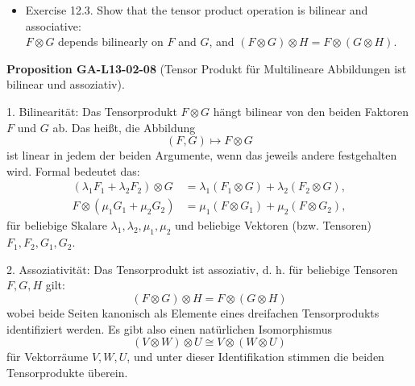 \documentclass[10pt, letterpaper]{article}
\newcommand{\CustomHeading}[3]{%
  \par\medskip\noindent%
  \textbf{#1 #2} \textnormal{(#3)}.\enskip%
}
\newenvironment{PROP}[2]{\begin{unitbox}\CustomHeading{Proposition}{#1}{#2}}{\end{unitbox}}
\begin{document}
\begin{itemize}
  \item Exercise 12.3. Show that the tensor product operation is bilinear and associative:\\
  $F \otimes G$ depends bilinearly on $F$ and $G$, and $(F \otimes G) \otimes H=F \otimes(G \otimes H)$.\\
\end{itemize}


\begin{PROP}{GA-L13-02-08}{Tensor Produkt für Multilineare Abbildungen ist bilinear und assoziativ}
1. Bilinearität: Das Tensorprodukt $F \otimes G$ hängt bilinear von den beiden Faktoren $F$ und $G$ ab. Das heißt, die Abbildung
$$
(F, G) \mapsto F \otimes G
$$
ist linear in jedem der beiden Argumente, wenn das jeweils andere festgehalten wird. Formal bedeutet das:
$$
\begin{aligned}
\left(\lambda_1 F_1+\lambda_2 F_2\right) \otimes G & =\lambda_1\left(F_1 \otimes G\right)+\lambda_2\left(F_2 \otimes G\right), \\
F \otimes\left(\mu_1 G_1+\mu_2 G_2\right) & =\mu_1\left(F \otimes G_1\right)+\mu_2\left(F \otimes G_2\right),
\end{aligned}
$$
für beliebige Skalare $\lambda_1, \lambda_2, \mu_1, \mu_2$ und beliebige Vektoren (bzw. Tensoren) $F_1, F_2, G_1, G_2$.

2. Assoziativität: Das Tensorprodukt ist assoziativ, d. h. für beliebige Tensoren $F, G, H$ gilt:
$$
(F \otimes G) \otimes H=F \otimes(G \otimes H)
$$
wobei beide Seiten kanonisch als Elemente eines dreifachen Tensorprodukts identifiziert werden. Es gibt also einen natürlichen Isomorphismus
$$
(V \otimes W) \otimes U \cong V \otimes(W \otimes U)
$$
für Vektorräume $V, W, U$, und unter dieser Identifikation stimmen die beiden Tensorprodukte überein.
\end{PROP}
\end{document}
